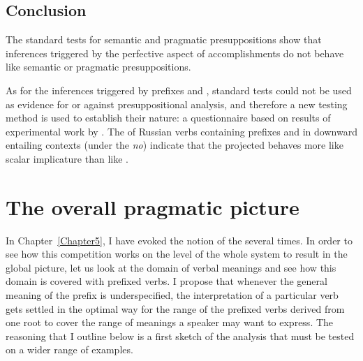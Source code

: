 \subsection{Conclusion}
The standard tests for semantic and pragmatic presuppositions show that inferences triggered by the perfective aspect of accomplishments do not behave like semantic or pragmatic presuppositions.

As for the inferences triggered by prefixes  and , standard tests could not be used as evidence for or against presuppositional analysis, and therefore a new testing method is used to establish their nature: a questionnaire based on results of experimental work by \citet{Chemla:09}.
The  of Russian verbs containing prefixes  and  in downward entailing contexts (under the  \textit{no}) indicate that the projected  behaves more like scalar implicature than like .


\section{The overall pragmatic picture}\label{section:pragm:overall}
In Chapter~\ref{Chapter5}, I have evoked the notion of the  several times. In order to see how this competition works on the level of the whole  system to result in the global picture, let us look at the domain of verbal meanings and see how this domain is covered with prefixed verbs. I propose that whenever the general meaning of the prefix is underspecified, the interpretation of a particular verb gets settled in the optimal way for the range of the prefixed verbs derived from one root to cover the range of meanings a speaker may want to express. The reasoning that I outline below is a first sketch of the analysis that must be tested on a wider range of examples.

